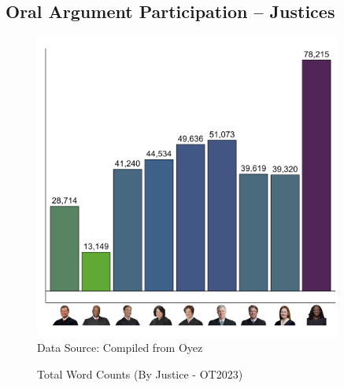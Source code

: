 \subsection{\centering Oral Argument Participation -- Justices}
\begin{figure}[H]
\centering
\caption{Total Word Counts (By Justice - OT2023)}
\vspace{2.5mm}
\includegraphics[width = 0.9\textwidth]{"Figures/statpack_figures/word_count_plot_OT23.png"} \\
\vspace{2mm}
\footnotesize{Data Source: Compiled from Oyez}
\end{figure}

